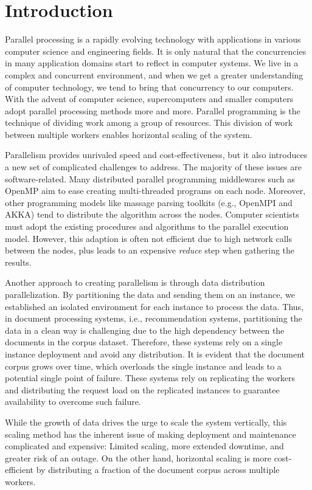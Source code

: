 \chapter{Introduction}

Parallel processing is a rapidly evolving technology with applications in various computer science and engineering fields. It is only natural that the concurrencies in many application domains start to reflect in computer systems. We live in a complex and concurrent environment, and when we get a greater understanding of computer technology, we tend to bring that concurrency to our computers. With the advent of computer science, supercomputers and smaller computers adopt parallel processing methods more and more. Parallel programming is the technique of dividing work among a group of resources. This division of work between multiple workers enables horizontal scaling of the system. 


Parallelism provides unrivaled speed and cost-effectiveness, but it also introduces a new set of complicated challenges to address. The majority of these issues are software-related. Many distributed parallel programming middlewares such as OpenMP aim to ease creating multi-threaded programs on each node. Moreover, other programming models like massage parsing toolkits (e.g., OpenMPI and AKKA) tend to distribute the algorithm across the nodes. Computer scientists must adopt the existing procedures and algorithms to the parallel execution model. However, this adaption is often not efficient due to high network calls between the nodes, plus leads to an expensive \emph{reduce} step when gathering the results.


Another approach to creating parallelism is through data distribution parallelization. By partitioning the data and sending them on an instance, we established an isolated environment for each instance to process the data. Thus, in document processing systems, i.e., recommendation systems, partitioning the data in a clean way is challenging due to the high dependency between the documents in the corpus dataset. Therefore, these systems rely on a single instance deployment and avoid any distribution. It is evident that the document corpus grows over time, which overloads the single instance and leads to a potential single point of failure. These systems rely on replicating the workers and distributing the request load on the replicated instances to guarantee availability to overcome such failure.


While the growth of data drives the urge to scale the system vertically, this scaling method has the inherent issue of making deployment and maintenance complicated and expensive: Limited scaling, more extended downtime, and greater risk of an outage. On the other hand, horizontal scaling is more cost-efficient by distributing a fraction of the document corpus across multiple workers.


